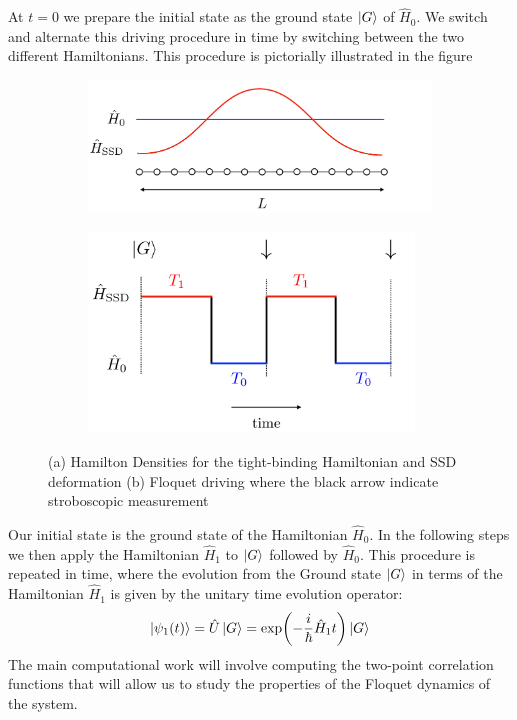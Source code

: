 \documentclass[11pt, a4paper]{article}
\theoremstyle{definition} %
\begin{document}
	
	At $t=0$ we prepare the initial state as the ground state $\ket{G}$ of $\hat{H}_0$. We switch and alternate this driving procedure in time by switching between the two different Hamiltonians. This procedure is pictorially illustrated in the figure
\begin{figure}[h]
\centering
		\begin{subfigure}[b]{0.45\textwidth}
			\includegraphics[width=\textwidth]{Floquet_Drive1D_Deformation.pdf}
			\caption{}
		\end{subfigure}
		\begin{subfigure}[b]{0.45\textwidth}
			\includegraphics[width=0.95\textwidth]{Floquet_Drive.pdf}
			\caption{}
		\end{subfigure}
		\caption{(a) Hamilton Densities for the tight-binding Hamiltonian and SSD deformation (b) Floquet driving where the black arrow indicate stroboscopic measurement}
\end{figure}
	Our initial state is the ground state of the Hamiltonian $\hat{H}_0$. In the following steps we then apply the Hamiltonian $\hat{H}_1$ to $\ket{G}$ followed by $\hat{H}_0$. This procedure is repeated in time, where the evolution from the Ground state $\ket{G}$ in terms of the Hamiltonian $\hat{H}_1$ is given by the unitary time evolution operator:
	\begin{equation}
		\ket{\psi_1(t)} = \hat{U}\ket{G} = \exp(-\frac{i}{\hbar} \hat{H}_1 t)\ket{G}
	\end{equation} 
	The main computational work will involve computing the two-point correlation functions that will allow us to study the properties of the Floquet dynamics of the system. \\
	
\end{document}
